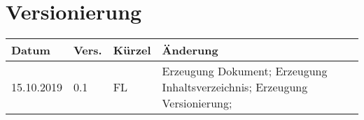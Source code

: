 \newpage
\tableofcontents

\section*{Versionierung}
\begin{tabular}{|p{2cm}|p{1cm}|p{1.5cm}|p{10.5cm}|}\hline
Datum & Vers. & Kürzel & Änderung \\ \hline
15.10.2019 & 0.1 & FL & Erzeugung Dokument; Erzeugung Inhaltsverzeichnis; Erzeugung Versionierung; \\ \hline
\end{tabular}
\listoffigures